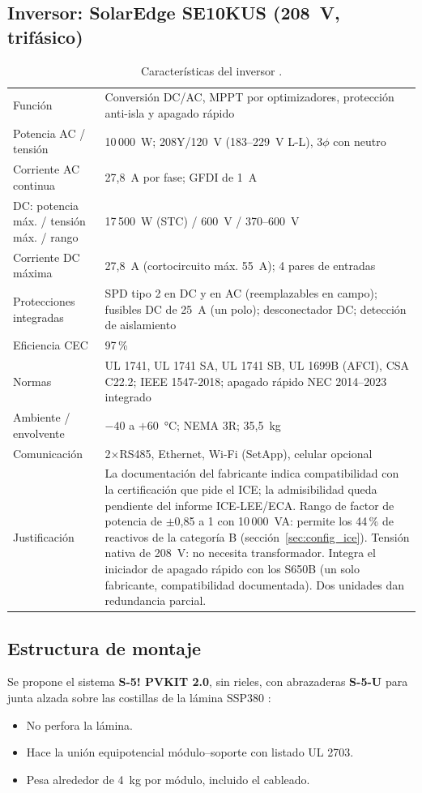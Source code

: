 \documentclass[12pt]{article}
\begin{document}
\subsection{Inversor: SolarEdge SE10KUS (208~V, trifásico)}
\begin{table}[H]
\centering\small
\caption{Características del inversor \cite{seInv}.}\label{tab:inversor}
\begin{tabularx}{\textwidth}{L{5.4cm}Y}
\toprule
Función & Conversión DC/AC, MPPT por optimizadores, protección anti-isla y apagado rápido\\
Potencia AC / tensión & 10\,000~W; 208Y/120~V (183--229~V L-L), 3$\phi$ con neutro\\
Corriente AC continua & 27,8~A por fase; GFDI de 1~A\\
DC: potencia máx. / tensión máx. / rango & 17\,500~W (STC) / 600~V / 370--600~V\\
Corriente DC máxima & 27,8~A (cortocircuito máx. 55~A); 4 pares de entradas\\
Protecciones integradas & SPD tipo 2 en DC y en AC (reemplazables en campo); fusibles DC de 25~A (un polo); desconectador DC; detección de aislamiento\\
Eficiencia CEC & 97\,\%\\
Normas & UL 1741, UL 1741 SA, UL 1741 SB, UL 1699B (AFCI), CSA C22.2; IEEE 1547-2018; apagado rápido NEC 2014--2023 integrado\\
Ambiente / envolvente & $-40$ a $+60$~°C; NEMA 3R; 35,5~kg\\
Comunicación & 2$\times$RS485, Ethernet, Wi-Fi (SetApp), celular opcional\\
Justificación & La documentación del fabricante indica compatibilidad con la certificación que pide el ICE; la admisibilidad queda pendiente del informe ICE-LEE/ECA. Rango de factor de potencia de $\pm$0,85 a 1 con 10\,000~VA: permite los 44\,\% de reactivos de la categoría B (sección~\ref{sec:config_ice}). Tensión nativa de 208~V: no necesita transformador. Integra el iniciador de apagado rápido con los S650B (un solo fabricante, compatibilidad documentada). Dos unidades dan redundancia parcial.\\
\bottomrule
\end{tabularx}
\end{table}

\subsection{Estructura de montaje}
Se propone el sistema \textbf{S-5! PVKIT 2.0}, sin rieles, con abrazaderas \textbf{S-5-U} para junta alzada sobre las costillas de la lámina SSP380 \cite{s5}:
\begin{itemize}
\item No perfora la lámina.
\item Hace la unión equipotencial módulo--soporte con listado UL 2703.
\item Pesa alrededor de \SI{4}{\kilogram} por módulo, incluido el cableado.
\end{itemize}
\end{document}
